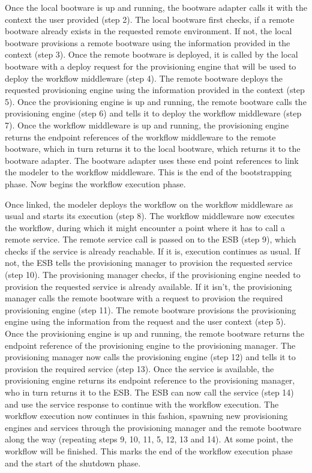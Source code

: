 Once the local bootware is up and running, the bootware adapter calls it with the context the user provided (step 2).
The local bootware first checks, if a remote bootware already exists in the requested remote environment.
If not, the local bootware provisions a remote bootware using the information provided in the context (step 3).
Once the remote bootware is deployed, it is called by the local bootware with a deploy request for the provisioning engine that will be used to deploy the workflow middleware (step 4).
The remote bootware deploys the requested provisioning engine using the information provided in the context (step 5).
Once the provisioning engine is up and running, the remote bootware calls the provisioning engine (step 6) and tells it to deploy the workflow middleware (step 7).
Once the workflow middleware is up and running, the provisioning engine returns the endpoint references of the workflow middleware to the remote bootware, which in turn returns it to the local bootware, which returns it to the bootware adapter.
The bootware adapter uses these end point references to link the modeler to the workflow middleware.
This is the end of the bootstrapping phase.
Now begins the workflow execution phase.

Once linked, the modeler deploys the workflow on the workflow middleware as usual and starts its execution (step 8).
The workflow middleware now executes the workflow, during which it might encounter a point where it has to call a remote service.
The remote service call is passed on to the ESB (step 9), which checks if the service is already reachable.
If it is, execution continues as usual.
If not, the ESB tells the provisioning manager to provision the requested service (step 10).
The provisioning manager checks, if the provisioning engine needed to provision the requested service is already available.
If it isn't, the provisioning manager calls the remote bootware with a request to provision the required provisioning engine (step 11).
The remote bootware provisions the provisioning engine using the information from the request and the user context (step 5).
Once the provisioning engine is up and running, the remote bootware returns the endpoint reference of the provisioning engine to the provisioning manager.
The provisioning manager now calls the provisioning engine (step 12) and tells it to provision the required service (step 13).
Once the service is available, the provisioning engine returns its endpoint reference to the provisioning manager, who in turn returns it to the ESB.
The ESB can now call the service (step 14) and use the service response to continue with the workflow execution.
The workflow execution now continues in this fashion, spawning new provisioning engines and services through the provisioning manager and the remote bootware along the way (repeating steps 9, 10, 11, 5, 12, 13 and 14).
At some point, the workflow will be finished.
This marks the end of the workflow execution phase and the start of the shutdown phase.

